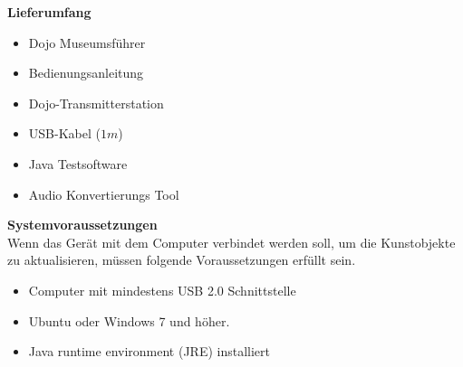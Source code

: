 \textbf{Lieferumfang}

\begin{itemize}
\item Dojo Museumsführer
\end{itemize}
\begin{itemize}
\item Bedienungsanleitung
\end{itemize}
\begin{itemize}
\item Dojo-Transmitterstation
\end{itemize}
\begin{itemize}
\item USB-Kabel ($1m$)
\end{itemize}
\begin{itemize}
\item Java Testsoftware
\end{itemize}
\begin{itemize}
\item Audio Konvertierungs Tool
\end{itemize}
\textbf{Systemvoraussetzungen}
\\[4mm]
Wenn das Gerät mit dem Computer verbindet werden soll, um die Kunstobjekte zu aktualisieren, müssen folgende Voraussetzungen erfüllt sein.
\begin{itemize}
\item Computer mit mindestens USB 2.0 Schnittstelle
\end{itemize}
\begin{itemize}
\item Ubuntu oder Windows 7 und höher.
\end{itemize}
\begin{itemize}
\item Java runtime environment (JRE) installiert
\end{itemize}